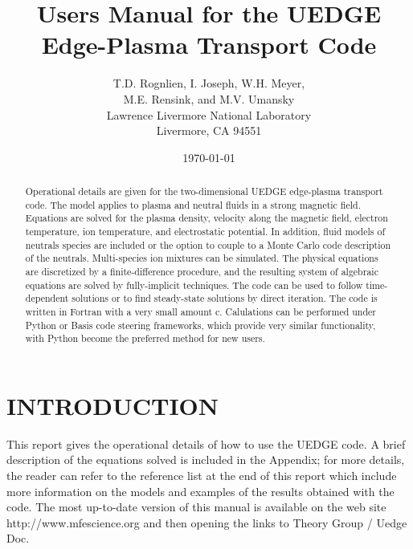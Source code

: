 \documentclass [12pt]{article}
\title{Users Manual for the {\sf UEDGE} Edge-Plasma Transport Code}
\author{T.D. Rognlien, I. Joseph, W.H. Meyer, \\ M.E. Rensink, and M.V. Umansky \\
  Lawrence Livermore National Laboratory \\
  Livermore, CA 94551}
\date{\today }
\begin{document}
\maketitle

\begin{abstract}

  Operational details are given for the two-dimensional {\sf UEDGE}
  edge-plasma transport code.  The model applies to plasma and neutral
  fluids in a strong magnetic field. Equations are solved for the
  plasma density, velocity along the magnetic field, electron
  temperature, ion temperature, and electrostatic potential.  In
  addition, fluid models of neutrals species are included or the
  option to couple to a Monte Carlo code description of the neutrals.
  Multi-species ion mixtures can be simulated.  The physical equations
  are discretized by a finite-difference procedure, and the resulting
  system of algebraic equations are solved by fully-implicit
  techniques.  The code can be used to follow time-dependent solutions
  or to find steady-state solutions by direct iteration.  The code is
  written in Fortran with a very small amount c.  Calulations can be
  performed under Python or Basis code steering frameworks, which
  provide very similar functionality, with Python become the preferred
  method for new users.

\end{abstract}

\tableofcontents


\pagebreak

\section{INTRODUCTION}

This report gives the operational details of how to use the {\sf UEDGE} code.
A brief description of the equations solved is included in the Appendix; for
more details, the reader can refer to the reference list at the end of this
report which include more information on the models and examples of the
results obtained with the code. The most up-to-date version of this manual
is available on the web site {\sf http://www.mfescience.org} and then opening
the links to Theory Group / Uedge Doc.
\end{document}
